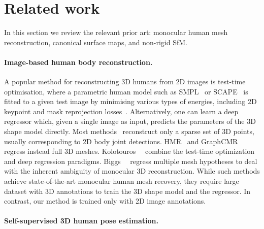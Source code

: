\section{Related work}\label{s:related}

In this section we review the relevant prior art: monocular human mesh reconstruction, canonical surface maps, and non-rigid SfM.


\paragraph{Image-based human body reconstruction.}

A popular method for reconstructing 3D humans from 2D images is test-time optimisation, where a parametric human model such as SMPL~\cite{loper15smpl:} or SCAPE~\cite{anguelov05scape:} is fitted to a given test image by minimising various types of energies, including 2D keypoint and mask reprojection losses~\cite{guan09estimating,sigal08combined,bogo16keep,Lassner2017,huang17towards,zanfir18monocular,joo18total,pavlakos19expressive,xiang19monocular}.
Alternatively, one can learn a deep regressor which, given a single image as input, predicts the parameters of the 3D shape model directly.
Most methods~\cite{anguelov05scape,mehta17vnect,rogez18lcr-net,sun18integral,kolotouros19convolutional, martinez17a-simple} reconstruct only a sparse set of 3D points, usually corresponding to 2D body joint detections.
HMR~\cite{kanazawa18end-to-end} and GraphCMR~\cite{kolotouros19convolutional} regress instead full 3D meshes.
Kolotouros~\etal~\cite{kolotouros19learning} combine the test-time optimization and deep regression paradigms.
Biggs~\etal~\cite{biggs20203d} regress multiple mesh hypotheses to deal with the inherent ambiguity of monocular 3D reconstruction.
While such methods achieve state-of-the-art monocular human mesh recovery, they require large dataset with 3D annotations to train the 3D shape model and the regressor.
In contrast, our method is trained only with 2D image annotations.

\paragraph{Self-supervised 3D human pose estimation.}

